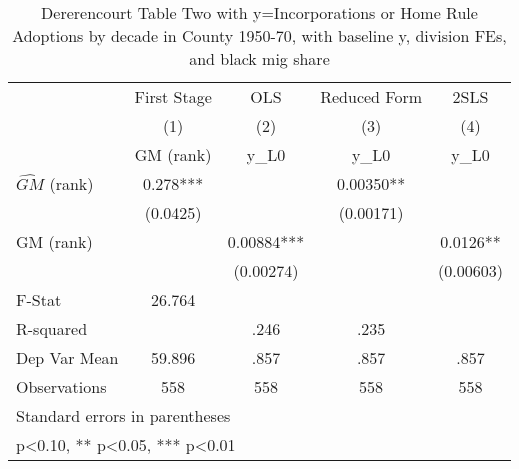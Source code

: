 \begin{table}[htbp]\centering
\def\sym#1{\ifmmode^{#1}\else\(^{#1}\)\fi}
\caption{Dererencourt Table Two with y=Incorporations or Home Rule Adoptions by decade in County 1950-70, with baseline y, division FEs, and black mig share}
\begin{tabular}{l*{4}{c}}
\toprule
                    & First Stage   &         OLS   &Reduced Form   &        2SLS   \\
                    &\multicolumn{1}{c}{(1)}&\multicolumn{1}{c}{(2)}&\multicolumn{1}{c}{(3)}&\multicolumn{1}{c}{(4)}\\
                    &\multicolumn{1}{c}{GM  (rank)}&\multicolumn{1}{c}{y\_L0}&\multicolumn{1}{c}{y\_L0}&\multicolumn{1}{c}{y\_L0}\\
\midrule
$\hat{GM}$ (rank)   &       0.278***&               &     0.00350** &               \\
                    &    (0.0425)   &               &   (0.00171)   &               \\
\addlinespace
GM  (rank)          &               &     0.00884***&               &      0.0126** \\
                    &               &   (0.00274)   &               &   (0.00603)   \\
\midrule
F-Stat              &      26.764   &               &               &               \\
R-squared           &               &        .246   &        .235   &               \\
Dep Var Mean        &      59.896   &        .857   &        .857   &        .857   \\
Observations        &         558   &         558   &         558   &         558   \\
\bottomrule
\multicolumn{5}{l}{\footnotesize Standard errors in parentheses}\\
\multicolumn{5}{l}{\footnotesize * p<0.10, ** p<0.05, *** p<0.01}\\
\end{tabular}
\end{table}
